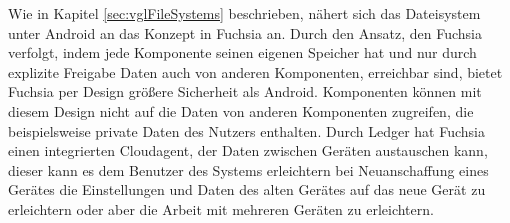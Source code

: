 \documentclass[a4paper]{scrartcl}
\begin{document}
Wie in Kapitel \ref{sec:vglFileSystems} beschrieben, nähert sich das Dateisystem unter Android an das Konzept in Fuchsia an. Durch den Ansatz, den Fuchsia verfolgt, indem jede Komponente seinen eigenen Speicher hat und nur durch explizite Freigabe Daten auch von anderen Komponenten, erreichbar sind, bietet Fuchsia per Design größere Sicherheit als Android. Komponenten können mit diesem Design nicht auf die Daten von anderen Komponenten zugreifen, die beispielsweise private Daten des Nutzers enthalten. Durch Ledger hat Fuchsia einen integrierten Cloudagent, der Daten zwischen Geräten austauschen kann, dieser kann es dem Benutzer des Systems erleichtern bei Neuanschaffung eines Gerätes die Einstellungen und Daten des alten Gerätes auf das neue Gerät zu erleichtern oder aber die Arbeit mit mehreren Geräten zu erleichtern.


\end{document}
